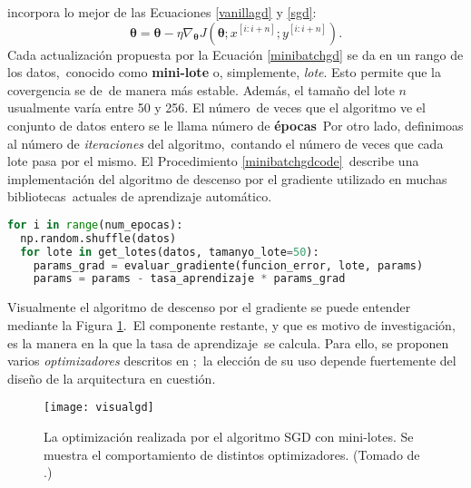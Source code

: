 incorpora lo mejor de las Ecuaciones \ref{vanillagd} y \ref{sgd}:
\begin{equation}
  \bm{\theta} = \bm{\theta} - \eta \nabla_{\bm{\theta}}J(\bm{\theta}; x^{[i:i+n]}; y^{[i:i+n]}). \label{minibatchgd}
\end{equation}
Cada actualización propuesta por la Ecuación \ref{minibatchgd} se da en un rango de los datos,\
conocido como \textbf{mini-lote} o, simplemente, \emph{lote}. Esto permite que la covergencia se de\
de manera más estable. Además, el tamaño del lote $n$ usualmente varía entre 50 y 256. El número\
de veces que el algoritmo ve el conjunto de datos entero se le llama número de \textbf{épocas}\
Por otro lado, definimoas al número de \emph{iteraciones} del algoritmo,\
contando el número de veces que cada lote pasa por el mismo. El Procedimiento \ref{minibatchgdcode}\
describe una implementación del algoritmo de descenso por el gradiente utilizado en muchas bibliotecas\
actuales de aprendizaje automático.
\begin{lstlisting}[language=Python,
    caption={
      Implementación del algoritmo de descenso por el gradiente utilizando mini-lotes, en lenguaje
      Python. Antes de iterar sobre todos los lotes, se mezclan los datos de manera aleatoria.
    },
   label=minibatchgdcode
  ]
  for i in range(num_epocas):
  np.random.shuffle(datos)
  for lote in get_lotes(datos, tamanyo_lote=50):
    params_grad = evaluar_gradiente(funcion_error, lote, params)
    params = params - tasa_aprendizaje * params_grad
\end{lstlisting}\par
Visualmente el algoritmo de descenso por el gradiente se puede entender mediante la Figura \ref{visualgd}.\
El componente restante, y que es motivo de investigación, es la manera en la que la tasa de aprendizaje\
se calcula. Para ello, se proponen varios \emph{optimizadores} descritos en \cite{DBLP:journals/corr/Ruder16};\
la elección de su uso depende fuertemente del diseño de la arquitectura en cuestión.

\begin{figure}[H]
  \centering
  \texttt{[image: visualgd]}
  \caption{
    La optimización realizada por el algoritmo SGD con mini-lotes. Se muestra
    el comportamiento de distintos optimizadores.
    (Tomado de \cite{DBLP:journals/corr/Ruder16}.)
  }
  \label{visualgd}
\end{figure}
